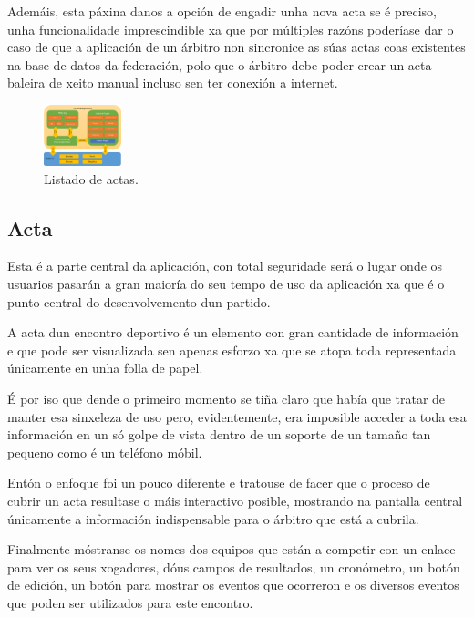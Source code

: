     Ademáis, esta páxina danos a opción de engadir unha nova acta se é preciso, 
unha funcionalidade imprescindible xa que por múltiples razóns 
poderíase dar o caso de que a aplicación de un árbitro non sincronice as súas 
actas coas existentes na base 
de datos da federación, polo que o árbitro debe poder crear un acta baleira de 
xeito manual incluso sen ter conexión a internet.

      \begin{figure}[h!]
        \begin{center}
        \includegraphics[width=0.2\textwidth]{./img/cordova_arquitectura.png}
        \caption{Listado de actas.}
        \end{center}
      \end{figure}

    \subsection{Acta}
    Esta é a parte central da aplicación, con total seguridade será o lugar 
onde os usuarios pasarán a gran maioría do seu tempo de uso da aplicación xa 
que é o punto central do desenvolvemento dun partido.

    A acta dun encontro deportivo é un elemento con gran cantidade de 
información e que pode ser visualizada sen apenas esforzo xa que se atopa 
toda representada únicamente en unha folla de papel.

    É por iso que dende o primeiro momento se tiña claro que había que tratar 
de manter esa sinxeleza de uso pero, evidentemente, era imposible acceder a 
toda esa información en un só golpe de vista dentro de un soporte de un tamaño 
tan pequeno como é un teléfono móbil.

    Entón o enfoque foi un pouco diferente e tratouse de facer que o proceso de 
cubrir un acta resultase o máis interactivo posible, mostrando na pantalla 
central únicamente a información indispensable para o árbitro que está a 
cubrila.

    Finalmente móstranse os nomes dos equipos que están a competir con un 
enlace para ver os seus xogadores, dóus campos de resultados, un 
cronómetro, un botón de edición, un botón para mostrar os eventos que 
ocorreron e os diversos eventos que poden ser utilizados para este encontro.

